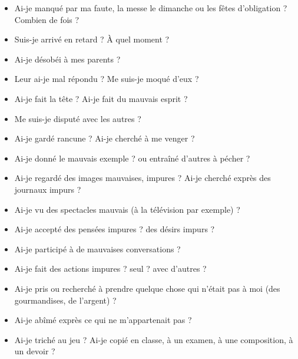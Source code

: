 \begin{itemize}
\item Ai-je manqué par ma faute, la messe le dimanche ou les fêtes d’obligation ? Combien de fois ?
\item Suis-je arrivé en retard ? À quel moment ?
\end{itemize}

\begin{itemize}
\item Ai-je désobéi à mes parents ?
\item Leur ai-je mal répondu ? Me suis-je moqué d’eux ?
\item Ai-je fait la tête ? Ai-je fait du mauvais esprit ?
\end{itemize}

\begin{itemize}
\item Me suis-je disputé avec les autres ?
\item Ai-je gardé rancune ? Ai-je cherché à me venger ?
\item Ai-je donné le mauvais exemple ? ou entraîné d’autres à pécher ?
\end{itemize}

\begin{itemize}
\item Ai-je regardé des images mauvaises, impures ? Ai-je cherché exprès des journaux impurs ?
\item Ai-je vu des spectacles mauvais (à la télévision par exemple) ?
\item Ai-je accepté des pensées impures ? des désirs impurs ?
\item Ai-je participé à de mauvaises conversations ?
\item Ai-je fait des actions impures ? seul ? avec d’autres ?
\end{itemize}

\begin{itemize}
\item Ai-je pris ou recherché à prendre quelque chose qui n’était pas à moi (des gourmandises, de l’argent) ?
\item Ai-je abîmé exprès ce qui ne m’appartenait pas ?
\item Ai-je triché au jeu ? Ai-je copié en classe, à un examen, à une composition, à un devoir ?
\end{itemize}


